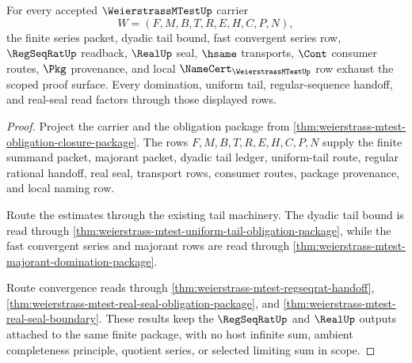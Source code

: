 \begin{theorem}
\label{thm:weierstrass-mtest-scoped-dependency-package}
For every accepted $\WeierstrassMTestUp$ carrier
$$
W=(F,M,B,T,R,E,H,C,P,N),
$$
the finite series packet, dyadic tail bound, fast convergent series row, $\RegSeqRatUp$ readback, $\RealUp$ seal, $\hsame$ transports, $\Cont$ consumer routes, $\Pkg$ provenance, and local $\NameCert_{\WeierstrassMTestUp}$ row exhaust the scoped proof surface. Every domination, uniform tail, regular-sequence handoff, and real-seal read factors through those displayed rows.
\end{theorem}
\begin{proof}
Project the carrier and the obligation package from \autoref{thm:weierstrass-mtest-obligation-closure-package}. The rows $F,M,B,T,R,E,H,C,P,N$ supply the finite summand packet, majorant packet, dyadic tail ledger, uniform-tail route, regular rational handoff, real seal, transport rows, consumer routes, package provenance, and local naming row.

Route the estimates through the existing tail machinery. The dyadic tail bound is read through \autoref{thm:weierstrass-mtest-uniform-tail-obligation-package}, while the fast convergent series and majorant rows are read through \autoref{thm:weierstrass-mtest-majorant-domination-package}.

Route convergence reads through \autoref{thm:weierstrass-mtest-regseqrat-handoff}, \autoref{thm:weierstrass-mtest-real-seal-obligation-package}, and \autoref{thm:weierstrass-mtest-real-seal-boundary}. These results keep the $\RegSeqRatUp$ and $\RealUp$ outputs attached to the same finite package, with no host infinite sum, ambient completeness principle, quotient series, or selected limiting sum in scope.
\end{proof}

